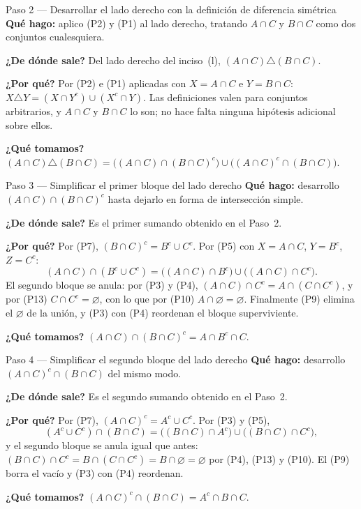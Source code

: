 \documentclass[11pt]{article}
\begin{document}
\begin{paso}{Paso 2 --- Desarrollar el lado derecho con la definición de diferencia simétrica}
\textbf{Qué hago:} aplico (P2) y (P1) al lado derecho, tratando $A\cap C$ y $B\cap C$ como dos
conjuntos cualesquiera.

\textbf{¿De dónde sale?} Del lado derecho del inciso~(l), $(A\cap C)\triangle(B\cap C)$.

\textbf{¿Por qué?} Por (P2) e (P1) aplicadas con $X=A\cap C$ e $Y=B\cap C$:
$X\triangle Y=(X\cap Y^{c})\cup(X^{c}\cap Y)$. Las definiciones valen para conjuntos
arbitrarios, y $A\cap C$ y $B\cap C$ lo son; no hace falta ninguna hipótesis adicional sobre
ellos.

\textbf{¿Qué tomamos?}
$(A\cap C)\triangle(B\cap C)=\bigl((A\cap C)\cap(B\cap C)^{c}\bigr)\cup\bigl((A\cap C)^{c}\cap(B\cap C)\bigr)$.
\end{paso}

\begin{paso}{Paso 3 --- Simplificar el primer bloque del lado derecho}
\textbf{Qué hago:} desarrollo $(A\cap C)\cap(B\cap C)^{c}$ hasta dejarlo en forma de
intersección simple.

\textbf{¿De dónde sale?} Es el primer sumando obtenido en el Paso~2.

\textbf{¿Por qué?} Por (P7), $(B\cap C)^{c}=B^{c}\cup C^{c}$. Por (P5) con $X=A\cap C$,
$Y=B^{c}$, $Z=C^{c}$:
\[
(A\cap C)\cap(B^{c}\cup C^{c})=\bigl((A\cap C)\cap B^{c}\bigr)\cup\bigl((A\cap C)\cap C^{c}\bigr).
\]
El segundo bloque se anula: por (P3) y (P4), $(A\cap C)\cap C^{c}=A\cap(C\cap C^{c})$, y por
(P13) $C\cap C^{c}=\varnothing$, con lo que por (P10) $A\cap\varnothing=\varnothing$. Finalmente
(P9) elimina el $\varnothing$ de la unión, y (P3) con (P4) reordenan el bloque superviviente.

\textbf{¿Qué tomamos?} $(A\cap C)\cap(B\cap C)^{c}=A\cap B^{c}\cap C$.
\end{paso}

\begin{paso}{Paso 4 --- Simplificar el segundo bloque del lado derecho}
\textbf{Qué hago:} desarrollo $(A\cap C)^{c}\cap(B\cap C)$ del mismo modo.

\textbf{¿De dónde sale?} Es el segundo sumando obtenido en el Paso~2.

\textbf{¿Por qué?} Por (P7), $(A\cap C)^{c}=A^{c}\cup C^{c}$. Por (P3) y (P5),
\[
(A^{c}\cup C^{c})\cap(B\cap C)=\bigl((B\cap C)\cap A^{c}\bigr)\cup\bigl((B\cap C)\cap C^{c}\bigr),
\]
y el segundo bloque se anula igual que antes: $(B\cap C)\cap C^{c}=B\cap(C\cap C^{c})
=B\cap\varnothing=\varnothing$ por (P4), (P13) y (P10). El (P9) borra el vacío y (P3) con (P4)
reordenan.

\textbf{¿Qué tomamos?} $(A\cap C)^{c}\cap(B\cap C)=A^{c}\cap B\cap C$.
\end{paso}
\end{document}
